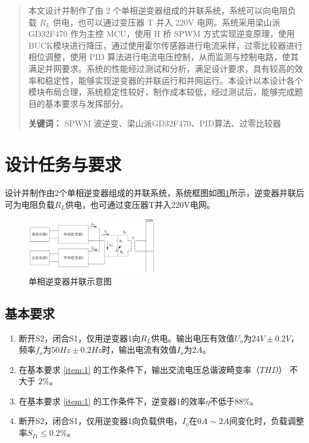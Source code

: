 \documentclass[a4paper,12pt]{article}
\begin{document}



\newpage
\begin{abstract}
本文设计并制作了由 2 个单相逆变器组成的并联系统，系统可以向电阻负载 $R_L$ 供电，也可以通过变压器 T 并入 220V 电网。系统采用梁山派GD32F470 作为主控 MCU，使用 H 桥 SPWM 方式实现逆变原理，使用BUCK模块进行降压，通过使用霍尔传感器进行电流采样，过零比较器进行相位调整，使用 PID 算法进行电流电压控制，从而监测与控制电路，使其满足并网要求。系统的性能经过测试和分析，满足设计要求，具有较高的效率和稳定性，能够实现逆变器的并联运行和并网运行。本设计以本设计各个模块布局合理，系统稳定性较好，制作成本较低，经过测试后，能够完成题目的基本要求与发挥部分。


\noindent \textbf{关键词：} 
SPWM 波逆变、梁山派GD32F470、PID算法、过零比较器
\end{abstract}

\newpage

\tableofcontents

\newpage

\section{设计任务与要求}
设计并制作由2个单相逆变器组成的并联系统，系统框图如图\ref{fig1}所示，逆变器并联后可为电阻负载$R_L$供电，也可通过变压器T并入220V电网。
\begin{figure}[htbp]
\centering
\includegraphics[width=0.5\textwidth]{src/fig1.png}
\caption{单相逆变器并联示意图}
\label{fig1}
\end{figure}
\subsection{基本要求}
\begin{enumerate}
    \item 断开S2，闭合S1，仅用逆变器1向$R_L$供电。输出电压有效值$U_o$为$24V\pm0.2V$，频率$f_o$为$50Hz\pm0.2Hz$时，输出电流有效值$I_o$为$2A$。\label{item:1}
    \item 在基本要求 \ref{item:1} 的工作条件下，输出交流电压总谐波畸变率（$THD$） 不大于 $2\%$。
    \item 在基本要求 \ref{item:1} 的工作条件下，逆变器1的效率$\eta$不低于$88\%$。
    \item 断开S2，闭合S1，仅用逆变器1向负载供电，$I_o$在$0A\sim 2A$间变化时，负载调整率$S_{I1}\leq 0.2\%$。
\end{enumerate}
\end{document}
